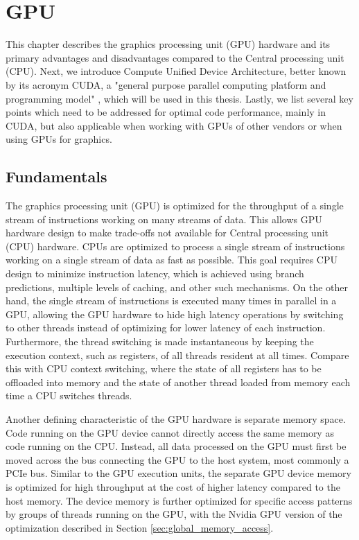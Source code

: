 \chapter{GPU}

This chapter describes the graphics processing unit (GPU) hardware and its primary advantages and disadvantages compared to the Central processing unit (CPU). Next, we introduce Compute Unified Device Architecture, better known by its acronym CUDA, a "general purpose parallel computing platform and programming model" \citep{site:cuda}, which will be used in this thesis. Lastly, we list several key points which need to be addressed for optimal code performance, mainly in CUDA, but also applicable when working with GPUs of other vendors or when using GPUs for graphics.

\section{Fundamentals}
\label{sec:gpu}

The graphics processing unit (GPU) is optimized for the throughput of a single stream of instructions working on many streams of data. This allows GPU hardware design to make trade-offs not available for Central processing unit (CPU) hardware.
CPUs are optimized to process a single stream of instructions working on a single stream of data as fast as possible. This goal requires CPU design to minimize instruction latency, which is achieved using branch predictions, multiple levels of caching, and other such mechanisms. On the other hand,  the single stream of instructions is executed many times in parallel in a GPU, allowing the GPU hardware to hide high latency operations by switching to other threads instead of optimizing for lower latency of each instruction. Furthermore, the thread switching is made instantaneous by keeping the execution context, such as registers, of all threads resident at all times. Compare this with CPU context switching, where the state of all registers has to be offloaded into memory and the state of another thread loaded from memory each time a CPU switches threads.

Another defining characteristic of the GPU hardware is separate memory space. Code running on the GPU device cannot directly access the same memory as code running on the CPU. Instead, all data processed on the GPU must first be moved across the bus connecting the GPU to the host system, most commonly a PCIe bus. Similar to the GPU execution units, the separate GPU device memory is optimized for high throughput at the cost of higher latency compared to the host memory. The device memory is further optimized for specific access patterns by groups of threads running on the GPU, with the Nvidia GPU version of the optimization described in Section \ref{sec:global_memory_access}.
 
